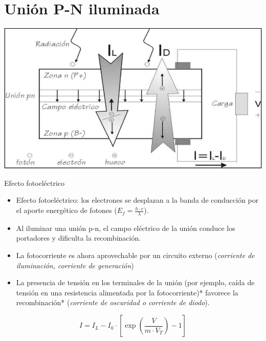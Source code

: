 \documentclass[xcolor={usenames,svgnames,dvipsnames}]{beamer}
\begin{document}
\section{Unión P-N iluminada}
\label{sec-2}

\begin{frame}[label=sec-2-0-1]{}
\includegraphics[width=.9\linewidth]{../figs/CelulaSolar.pdf}
\end{frame}

\begin{frame}[label=sec-2-0-2]{Efecto fotoeléctrico}
\begin{itemize}
\item Efecto fotoeléctrico: \alert{los electrones se desplazan a la banda de
conducción por el aporte energético de fotones}
($E_{f}=\frac{h\cdot c}{\lambda}$).

\item Al \alert{iluminar una unión p-n}, el \alert{campo eléctrico} de la unión conduce
los portadores y \alert{dificulta la recombinación}.

\item La \alert{fotocorriente} es ahora \alert{aprovechable} por un circuito externo
(\emph{corriente de iluminación, corriente de generación})

\item La presencia de \alert{tensión en los terminales} de la unión (por ejemplo,
caída de tensión en una resistencia alimentada por la fotocorriente)*
favorece la recombinación* (\emph{corriente de oscuridad o corriente de
diodo}).
\end{itemize}

$$I=I_{L}-I_{0}\cdot[\exp(\frac{V}{m\cdot V_{T}})-1]$$
\end{frame}
\end{document}
